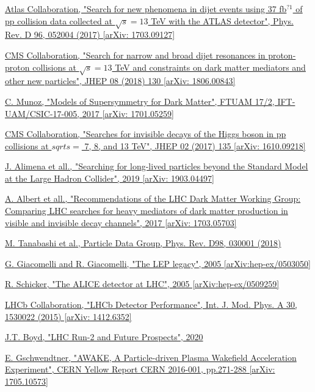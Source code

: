 \documentclass[a4paper, 10pt, openright]{report}
\begin{document}
\begin{thebibliography}{1}
\href{https://arxiv.org/abs/1703.09127}{Atlas Collaboration,
"Search for new phenomena in dijet events using 37 fb$^{?1}$ of pp collision data collected at $\sqrt{s} = 13$ TeV with the ATLAS detector",
Phys. Rev. D 96, 052004 (2017) [arXiv: 1703.09127]
}

\href{https://arxiv.org/abs/1806.00843}{CMS Collaboration,
"Search for narrow and broad dijet resonances in proton-proton collisions at $\sqrt{s} = 13$ TeV and constraints on dark matter mediators and other new particles",
JHEP 08 (2018) 130 [arXiv: 1806.00843]
}

\href{https://arxiv.org/abs/1701.05259}{C. Munoz,
"Models of Supersymmetry for Dark Matter",
FTUAM 17/2, IFT-UAM/CSIC-17-005, 2017 [arXiv: 1701.05259]
}

\href{https://arxiv.org/abs/1610.09218}{CMS Collaboration,
"Searches for invisible decays of the Higgs boson in pp collisions at $sqrt{s} =$ 7, 8, and 13 TeV",
JHEP 02 (2017) 135 [arXiv: 1610.09218]
}

\href{https://arxiv.org/abs/1903.04497?}{J. Alimena et all.,
"Searching for long-lived particles beyond the Standard Model at the Large Hadron Collider",
2019 [arXiv: 1903.04497]
}

\href{https://arxiv.org/abs/1703.05703}{A. Albert et all.,
"Recommendations of the LHC Dark Matter Working Group: Comparing LHC searches for heavy mediators of dark matter production in visible and invisible decay channels",
2017 [arXiv: 1703.05703]
}

\href{http://pdg.lbl.gov/}{M. Tanabashi et al.,
Particle Data Group,
Phys. Rev. D98, 030001 (2018)}

\href{https://arxiv.org/abs/hep-ex/0503050}{G. Giacomelli and R. Giacomelli,
"The LEP legacy", 
2005 [arXiv:hep-ex/0503050]}

\href{https://arxiv.org/abs/hep-ph/0509259}{R. Schicker,
"The ALICE detector at LHC",
2005 [arXiv:hep-ex/0509259]
}

\href{https://arxiv.org/abs/1412.6352}{LHCb Collaboration,
"LHCb Detector Performance",
Int. J. Mod. Phys. A 30, 1530022 (2015) [arXiv: 1412.6352]
}

\href{https://www.researchgate.net/publication/338569771_LHC_Run-2_and_Future_Prospects}{J.T. Boyd,
"LHC Run-2 and Future Prospects",
2020}

\href{https://arxiv.org/abs/1705.10573}{E. Gschwendtner,
"AWAKE, A Particle-driven Plasma Wakefield Acceleration Experiment",
CERN Yellow Report CERN 2016-001, pp.271-288 [arXiv: 1705.10573]
}


\end{thebibliography}
\end{document}
